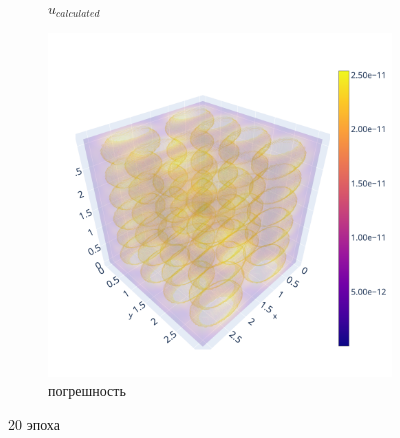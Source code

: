 \documentclass[a4paper,hidelinks,12pt]{article}
\begin{document}
\begin{figure}[H]
\begin{subfigure}{.33\textwidth}
  \caption{$u_{calculated}$}
\end{subfigure}%
\begin{subfigure}{.33\textwidth}
  \centering
  \includegraphics[width=\linewidth]{pictures/19_Lpi_256_diff.png}
  \caption{погрешность}
\end{subfigure}%
\caption{20 эпоха}
\label{fig:fig}
\end{figure}
\end{document}
